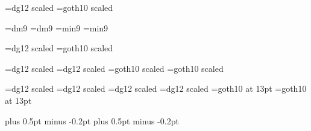 \ifNTT
\jfont\titledm=dg12 scaled 
\else
\font\titledm=goth10 scaled 
\fi

\ifNTT
\jfont\inddm=dm9
\jfont\inddg=dm9
\else
\font\inddm=min9
\font\inddg=min9
\fi

\ifNTT
\jfont\chapdm=dg12 scaled 
\else
\font\chapdm=goth10 scaled 
\fi
\let\chapdg=\chapdm

\ifNTT
\jfont\secdm=dg12 scaled 
\jfont\secdg=dg12 scaled 
\else
\font\secdm=goth10 scaled 
\font\secdg=goth10 scaled 
\fi

\ifNTT
\ifNTTOLD                       %
\jfont\ssecdm=dg12 scaled {\magstephalf}
\jfont\ssecdg=dg12 scaled {\magstephalf}
\else
\jfont\ssecdm=dg12 scaled \magstephalf
\jfont\ssecdg=dg12 scaled \magstephalf
\fi
\else
\font\ssecdm=goth10 at 13pt
\font\ssecdg=goth10 at 13pt
\fi

\ifNTT
\jintercharskip=0pt plus 0.5pt minus -0.2pt
\jasciikanjiskip=2.28854pt plus 0.5pt minus -0.2pt
\fi

\let\origrm=\rm
\def\rm{\origrm\tendm}
\let\origbf=\bf
\def\bf{\origbf\tendg}
\let\origsl=\sl
\def\sl{\origsl\tendg}

\let\origtextfonts=\textfonts
\def\textfonts{\let\tendm=\textdm\let\tendg=\textdg\origtextfonts\textrm\textdm
}
\let\origchapfonts=\chapfonts
\def\chapfonts{\let\tendm=\chapdm\let\tendg=\chapdg\origchapfonts}
\let\origsecfonts=\secfonts
\def\secfonts{\let\tendm=\secdm\let\tendg=\secdg\origsecfonts}
\let\origsubsecfonts=\subsecfonts
\def\subsecfonts{\let\tendm=\ssecdm\let\tendg=\ssecdg\origsubsecfonts}
\let\origindexfonts=\indexfonts
\def\indexfonts{\let\tendm=\inddm\let\tendg=\inddg\origindexfonts}

\def\titlefont#1{{%
\titlerm\titledm\spaceskip=.9\fontdimen2\titlerm%
\ifNTT\jintercharskip=-2pt\fi%
#1}}

\let\origignoremorecommands=\ignoremorecommands
\def\ignoremorecommands{
\origignoremorecommands
\let\result=\relax\let\expansion=\relax\let\print=\relax\let\equiv=\relax
}

